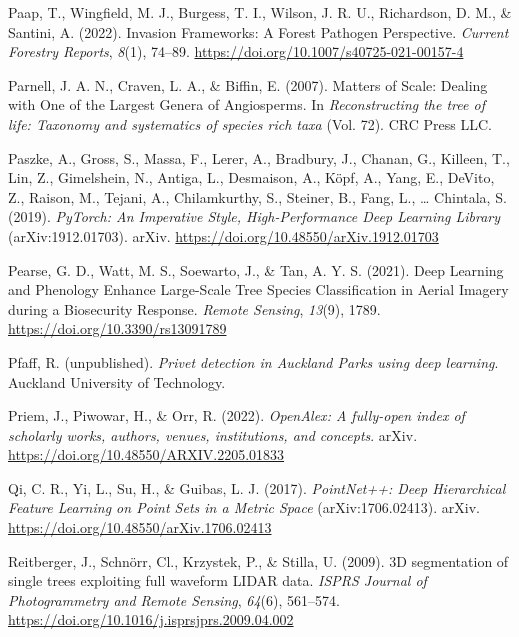 \documentclass[
]{scrreprt}
\newlength{\cslhangindent}
\newenvironment{CSLReferences}[2] %
 {\begin{list}{}{%
  \setlength{\itemindent}{0pt}
  \setlength{\leftmargin}{0pt}
  \setlength{\parsep}{0pt}
  \setlength{\baselineskip}{12pt}
  \ifodd #1
   \setlength{\leftmargin}{\cslhangindent}
   \setlength{\itemindent}{-1\cslhangindent}
  \fi
  \setlength{\itemsep}{4pt}}}
 {\end{list}}
\begin{document}
\begin{CSLReferences}{1}{0}
Paap, T., Wingfield, M. J., Burgess, T. I., Wilson, J. R. U.,
Richardson, D. M., \& Santini, A. (2022). Invasion {Frameworks}: A
{Forest Pathogen Perspective}. \emph{Current Forestry Reports},
\emph{8}(1), 74--89. \url{https://doi.org/10.1007/s40725-021-00157-4}

Parnell, J. A. N., Craven, L. A., \& Biffin, E. (2007). Matters of
{Scale}: {Dealing} with {One} of the {Largest Genera} of {Angiosperms}.
In \emph{Reconstructing the tree of life: Taxonomy and systematics of
species rich taxa} (Vol. 72). CRC Press LLC.

Paszke, A., Gross, S., Massa, F., Lerer, A., Bradbury, J., Chanan, G.,
Killeen, T., Lin, Z., Gimelshein, N., Antiga, L., Desmaison, A., Köpf,
A., Yang, E., DeVito, Z., Raison, M., Tejani, A., Chilamkurthy, S.,
Steiner, B., Fang, L., \ldots{} Chintala, S. (2019). \emph{{PyTorch}:
{An Imperative Style}, {High-Performance Deep Learning Library}}
(arXiv:1912.01703). arXiv.
\url{https://doi.org/10.48550/arXiv.1912.01703}

Pearse, G. D., Watt, M. S., Soewarto, J., \& Tan, A. Y. S. (2021). Deep
{Learning} and {Phenology Enhance Large-Scale Tree Species
Classification} in {Aerial Imagery} during a {Biosecurity Response}.
\emph{Remote Sensing}, \emph{13}(9), 1789.
\url{https://doi.org/10.3390/rs13091789}

Pfaff, R. (unpublished). \emph{Privet detection in {Auckland Parks}
using deep learning}. Auckland University of Technology.

Priem, J., Piwowar, H., \& Orr, R. (2022). \emph{{OpenAlex}: {A}
fully-open index of scholarly works, authors, venues, institutions, and
concepts}. arXiv. \url{https://doi.org/10.48550/ARXIV.2205.01833}

Qi, C. R., Yi, L., Su, H., \& Guibas, L. J. (2017). \emph{{PointNet}++:
{Deep Hierarchical Feature Learning} on {Point Sets} in a {Metric
Space}} (arXiv:1706.02413). arXiv.
\url{https://doi.org/10.48550/arXiv.1706.02413}

Reitberger, J., Schnörr, Cl., Krzystek, P., \& Stilla, U. (2009). {3D}
segmentation of single trees exploiting full waveform {LIDAR} data.
\emph{ISPRS Journal of Photogrammetry and Remote Sensing}, \emph{64}(6),
561--574. \url{https://doi.org/10.1016/j.isprsjprs.2009.04.002}


\end{CSLReferences}
\end{document}
